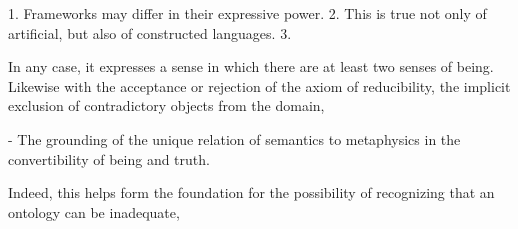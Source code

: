 \documentclass[]{article}
\begin{document}
1. Frameworks may differ in their expressive power.
2. This is true not only of artificial, but also of constructed languages.
3. 



In any case, it expresses a sense in which there are at least two senses of being. 
Likewise with the acceptance or rejection of the axiom of reducibility, 
the implicit exclusion of contradictory objects from the domain, 

- The grounding of the unique relation of semantics to metaphysics in the convertibility of being and truth.


Indeed, this helps form the foundation for the possibility of recognizing that an ontology can be inadequate, 


\end{document}
